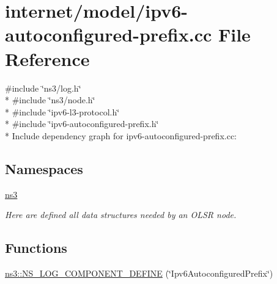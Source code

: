 \hypertarget{ipv6-autoconfigured-prefix_8cc}{}\section{internet/model/ipv6-\/autoconfigured-\/prefix.cc File Reference}
\label{ipv6-autoconfigured-prefix_8cc}
{\ttfamily \#include \char`\"{}ns3/log.\+h\char`\"{}}\\*
{\ttfamily \#include \char`\"{}ns3/node.\+h\char`\"{}}\\*
{\ttfamily \#include \char`\"{}ipv6-\/l3-\/protocol.\+h\char`\"{}}\\*
{\ttfamily \#include \char`\"{}ipv6-\/autoconfigured-\/prefix.\+h\char`\"{}}\\*
Include dependency graph for ipv6-\/autoconfigured-\/prefix.cc\+:
\subsection*{Namespaces}
\begin{DoxyCompactItemize}
\item 
 \hyperlink{namespacens3}{ns3}
\begin{DoxyCompactList}\small\item\em Here are defined all data structures needed by an O\+L\+SR node. \end{DoxyCompactList}\end{DoxyCompactItemize}
\subsection*{Functions}
\begin{DoxyCompactItemize}
\item 
\hyperlink{namespacens3_a0afefa3db8c608bff42061db7ac05edb}{ns3\+::\+N\+S\+\_\+\+L\+O\+G\+\_\+\+C\+O\+M\+P\+O\+N\+E\+N\+T\+\_\+\+D\+E\+F\+I\+NE} (\char`\"{}Ipv6\+Autoconfigured\+Prefix\char`\"{})
\end{DoxyCompactItemize}
